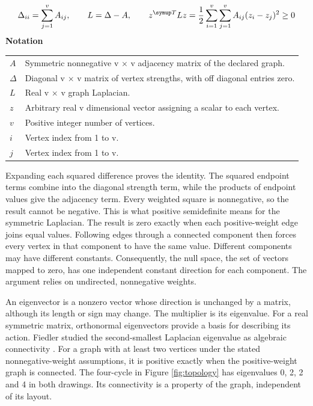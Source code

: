 \documentclass[10pt,letterpaper]{article}
\newcommand{\notlabel}{\noindent\textbf{Notation}\par\nobreak\vspace{4pt}}
\begin{document}
\par\noindent\begin{minipage}{\linewidth}
\begin{equation}\label{eq:laplacian}
\Delta_{ii}=\sum_{j=1}^{v} A_{ij},\qquad L=\Delta-A,\qquad z^{\symup T}Lz=\frac12\sum_{i=1}^{v}\sum_{j=1}^{v}A_{ij}(z_i-z_j)^2\geq0
\end{equation}
\notlabel
{\fontsize{8.5}{10.5}\selectfont\setlength{\tabcolsep}{0pt}\renewcommand{\arraystretch}{1.12}
\begin{tabularx}{\linewidth}{@{}p{.14\linewidth}X@{}}
$A$ & Symmetric nonnegative v \ensuremath{\times} v adjacency matrix of the declared graph.\\
$\Delta$ & Diagonal v \ensuremath{\times} v matrix of vertex strengths, with off diagonal entries zero.\\
$L$ & Real v \ensuremath{\times} v graph Laplacian.\\
$z$ & Arbitrary real v dimensional vector assigning a scalar to each vertex.\\
$v$ & Positive integer number of vertices.\\
$i$ & Vertex index from 1 to v.\\
$j$ & Vertex index from 1 to v.\\
\end{tabularx}}
\par\vspace{2pt}
\end{minipage}\par
Expanding each squared difference proves the identity. The squared endpoint terms combine into the diagonal strength term, while the products of endpoint values give the adjacency term. Every weighted square is nonnegative, so the result cannot be negative. This is what positive semidefinite means for the symmetric Laplacian. The result is zero exactly when each positive-weight edge joins equal values. Following edges through a connected component then forces every vertex in that component to have the same value. Different components may have different constants. Consequently, the null space, the set of vectors mapped to zero, has one independent constant direction for each component. The argument relies on undirected, nonnegative weights.\par

An eigenvector is a nonzero vector whose direction is unchanged by a matrix, although its length or sign may change. The multiplier is its eigenvalue. For a real symmetric matrix, orthonormal eigenvectors provide a basis for describing its action. Fiedler studied the second-smallest Laplacian eigenvalue as algebraic connectivity \cite{fiedler}. For a graph with at least two vertices under the stated nonnegative-weight assumptions, it is positive exactly when the positive-weight graph is connected. The four-cycle in Figure \ref{fig:topology} has eigenvalues 0, 2, 2 and 4 in both drawings. Its connectivity is a property of the graph, independent of its layout.\par
\end{document}
